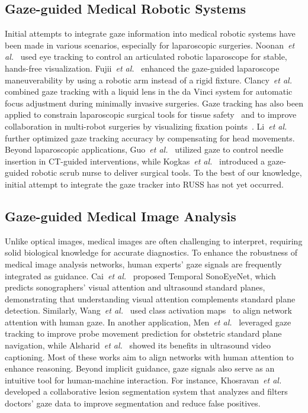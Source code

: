 \subsection{Gaze-guided Medical Robotic Systems}
Initial attempts to integrate gaze information into medical robotic systems have been made in various scenarios, especially for laparoscopic surgeries. 
Noonan~\emph{et al.}~\cite{noonan2010gaze} used eye tracking to control an articulated robotic laparoscope for stable, hands-free visualization. Fujii~\emph{et al.}~\cite{fujii2018gaze} enhanced the gaze-guided laparoscope maneuverability by using a robotic arm instead of a rigid fixture. Clancy~\emph{et al.}~\cite{clancy2011gaze} combined gaze tracking with a liquid lens in the da Vinci system for automatic focus adjustment during minimally invasive surgeries. Gaze tracking has also been applied to constrain laparoscopic surgical tools for tissue safety~\cite{mylonas2012gaze} and to improve collaboration in multi-robot surgeries by visualizing fixation points~\cite{kwok2012collaborative}. Li~\emph{et al.}~\cite{li2018free} further optimized gaze tracking accuracy by compensating for head movements.
Beyond laparoscopic applications, Guo~\emph{et al.}~\cite{guo2019novel} utilized gaze to control needle insertion in CT-guided interventions, while Kogkas~\emph{et al.}~\cite{kogkas2019free} introduced a gaze-guided robotic scrub nurse to deliver surgical tools. To the best of our knowledge, initial attempt to integrate the gaze tracker into RUSS has not yet occurred.

\subsection{Gaze-guided Medical Image Analysis}\label{sec_gaze_med_IA}
Unlike optical images, medical images are often challenging to interpret, requiring solid biological knowledge for accurate diagnostics. To enhance the robustness of medical image analysis networks, human experts' gaze signals are frequently integrated as guidance. Cai~\emph{et al.}~\cite{cai2020spatio} proposed Temporal SonoEyeNet, which predicts sonographers' visual attention and ultrasound standard planes, demonstrating that understanding visual attention complements standard plane detection. Similarly, Wang~\emph{et al.}~\cite{wang2022follow} used class activation maps~\cite{zhou2016learning} to align network attention with human gaze.
In another application, Men~\emph{et al.}~\cite{men2023gaze} leveraged gaze tracking to improve probe movement prediction for obstetric standard plane navigation, while Alsharid~\emph{et al.}~\cite{alsharid2022gaze} showed its benefits in ultrasound video captioning. Most of these works aim to align networks with human attention to enhance reasoning. Beyond implicit guidance, gaze signals also serve as an intuitive tool for human-machine interaction. For instance, Khosravan~\emph{et al.}~\cite{khosravan2019collaborative} developed a collaborative lesion segmentation system that analyzes and filters doctors' gaze data to improve segmentation and reduce false positives.

